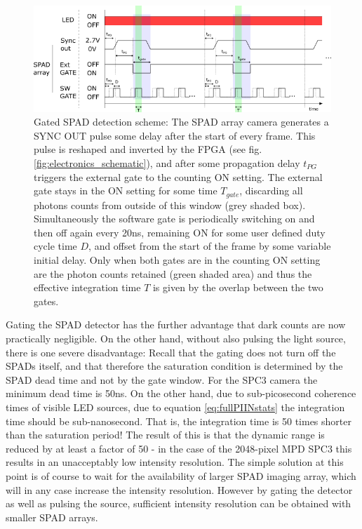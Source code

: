 \documentclass[]{article}
\begin{document}
		\begin{figure}[h]
			\centering
			\includegraphics[width=0.7\linewidth]{Figures/detectionScheme2}
			\caption{Gated SPAD detection scheme: The SPAD array camera generates a SYNC OUT pulse some delay after the start of every frame. This pulse is reshaped and inverted by the FPGA (see fig. \ref{fig:electronics_schematic}), and after some propagation delay $t_{PG}$ triggers the external gate to the counting ON setting. The external gate stays in the ON setting for some time $T_{gate}$, discarding all photons counts from outside of this window (grey shaded box). Simultaneously the software gate is periodically switching on and then off again every 20ns, remaining ON for some user defined duty cycle time $D$, and offset from the start of the frame by some variable initial delay. Only when both gates are in the counting ON setting are the photon counts retained (green shaded area) and thus the effective integration time $T$ is given by the overlap between the two gates.}
			\label{fig:detectionScheme2}
		\end{figure}
		
	Gating the SPAD detector has the further advantage that dark counts are now practically negligible. On the other hand, without also pulsing the light source, there is one severe disadvantage: Recall that the gating does not turn off the SPADs itself, and that therefore the saturation condition is determined by the SPAD dead time and not by the gate window. For the SPC3 camera the minimum dead time is 50ns. On the other hand, due to sub-picosecond coherence times of visible LED sources, due to equation \ref{eq:fullPIINstats} the integration time should be sub-nanosecond. That is, the integration time is 50 times shorter than the saturation period! The result of this is that the dynamic range is reduced by at least a factor of 50 - in the case of the 2048-pixel MPD SPC3 this results in an unacceptably low intensity resolution. The simple solution at this point is of course to wait for the availability of larger SPAD imaging array, which will in any case increase the intensity resolution. However by gating the detector as well as pulsing the source, sufficient intensity resolution can be obtained with smaller SPAD arrays.
	
\end{document}
